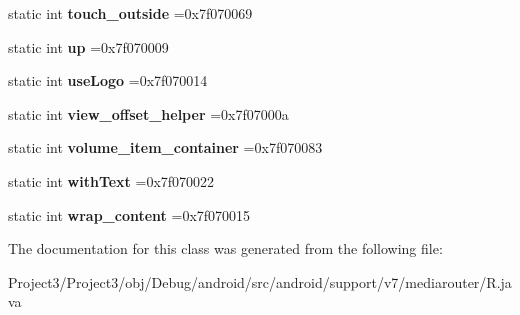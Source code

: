 \begin{DoxyCompactItemize}
static int {\bfseries touch\+\_\+outside} =0x7f070069
\item 
\mbox{\label{classandroid_1_1support_1_1v7_1_1mediarouter_1_1R_1_1id_a46bd0ad007eb477ca4c32986282eb4ad}} 
static int {\bfseries up} =0x7f070009
\item 
\mbox{\label{classandroid_1_1support_1_1v7_1_1mediarouter_1_1R_1_1id_afe13b48989f8872262dcc472dddbe719}} 
static int {\bfseries use\+Logo} =0x7f070014
\item 
\mbox{\label{classandroid_1_1support_1_1v7_1_1mediarouter_1_1R_1_1id_a42ad70fe229fc037908e549b65e0db45}} 
static int {\bfseries view\+\_\+offset\+\_\+helper} =0x7f07000a
\item 
\mbox{\label{classandroid_1_1support_1_1v7_1_1mediarouter_1_1R_1_1id_a2cda384d846ed031cf18085733c8dbff}} 
static int {\bfseries volume\+\_\+item\+\_\+container} =0x7f070083
\item 
\mbox{\label{classandroid_1_1support_1_1v7_1_1mediarouter_1_1R_1_1id_ac72df840547e6c831858fce4add53605}} 
static int {\bfseries with\+Text} =0x7f070022
\item 
\mbox{\label{classandroid_1_1support_1_1v7_1_1mediarouter_1_1R_1_1id_ac5c99e6e3879f82878c96f147afd1a2f}} 
static int {\bfseries wrap\+\_\+content} =0x7f070015
\end{DoxyCompactItemize}


The documentation for this class was generated from the following file\+:\begin{DoxyCompactItemize}
\item 
Project3/\+Project3/obj/\+Debug/android/src/android/support/v7/mediarouter/R.\+java\end{DoxyCompactItemize}
